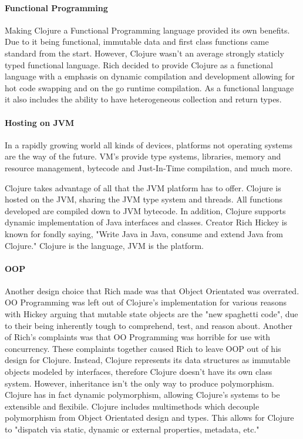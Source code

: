     \paragraph{Functional Programming}
    Making Clojure a Functional Programming language provided its own benefits. Due to it being functional, immutable data and first class functions came standard from the start. However, Clojure wasn't an average strongly staticly typed functional language. Rich decided to provide Clojure as a functional language with a emphasis on dynamic compilation and development allowing for hot code swapping and on the go runtime compilation. As a functional language it also includes the ability to have heterogeneous collection and return types. 
    
    \paragraph{Hosting on JVM}
    In a rapidly growing world all kinds of devices, platforms not operating systems are the way of the future. VM's  provide type systems, libraries, memory and resource management, bytecode and Just-In-Time compilation, and much more.
    
    Clojure takes advantage of all that the JVM platform has to offer. Clojure is hosted on the JVM, sharing the JVM type system and threads. All functions developed are compiled down to JVM bytecode. In addition, Clojure supports dynamic implementation of Java interfaces and classes. Creator Rich Hickey is known for fondly saying, "Write Java in Java, consume and extend Java from Clojure." Clojure is the language, JVM is the platform. \cite{JVMHostedLanguages_DependencyOnJava_JournalArticle_Li}
    
    \paragraph{OOP}
    Another design choice that Rich made was that Object Orientated was overrated. OO Programming was left out of Clojure's implementation for various reasons with Hickey arguing that mutable state objects are the "new spaghetti code", due to their being inherently tough to comprehend, test, and reason about. Another of Rich's complaints was that OO Programming was horrible for use with concurrency. These complaints together caused Rich to leave OOP out of his design for Clojure. 
    Instead, Clojure represents its data structures as immutable objects modeled by interfaces, therefore Clojure doesn't have its own class system. However, inheritance isn't the only way to produce polymorphism. Clojure has in fact dynamic polymorphism, allowing Clojure's systems to be extensible and flexibile. Clojure includes multimethods which decouple polymorphism from Object Orientated design and types. This allows for Clojure to "dispatch via static, dynamic or external properties, metadata, etc." 
    \cite{ClojureConcurrencySupport_Slides_Hickey}
      
